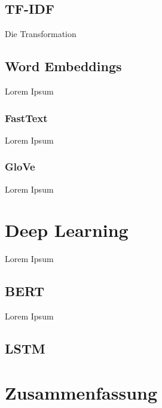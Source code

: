 \subsection{TF-IDF}

Die Transformation 

\subsection{Word Embeddings}

Lorem Ipsum

\subsubsection{FastText}

Lorem Ipsum

\subsubsection{GloVe}

Lorem Ipsum

\section{Deep Learning}

Lorem Ipsum

\subsection{BERT}

Lorem Ipsum

\subsection{LSTM}

\section{Zusammenfassung}
